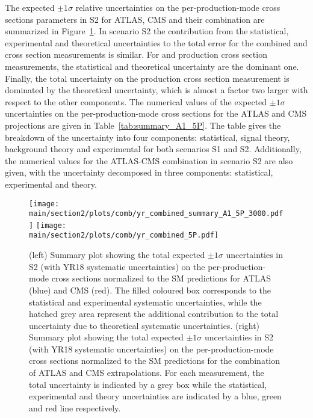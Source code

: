 The expected $\pm 1\sigma$ relative uncertainties on the per-production-mode cross sections parameters in S2 for ATLAS, CMS and their combination are summarized in Figure~\ref{fig:summary_A1_5P}.
In scenario S2 the contribution from the statistical, experimental and theoretical uncertainties to the total error for the combined  \ggH and \vbf cross section measurements is similar. For \wh and \zh production cross section measurements, the statistical  and theoretical uncertainty are the dominant one.
Finally, the total uncertainty on the \tth production cross section measurement is dominated by the theoretical uncertainty, which is almost a factor two larger with respect to the other components.
The numerical values of the expected $\pm 1\sigma$ uncertainties on the per-production-mode cross sections for the ATLAS and CMS projections are given in Table~\ref{tab:summary_A1_5P}. The table  gives the breakdown of the uncertainty into four components: statistical, signal theory, background theory and experimental for both scenarios S1 and S2. Additionally, the numerical values for the ATLAS-CMS combination in scenario S2 are also given, with the uncertainty decomposed in three components: statistical, experimental and theory.

\begin{figure}[hbtp]
\centering
\texttt{[image: \\main/section2/plots/comb/yr\_combined\_summary\_A1\_5P\_3000.pdf]}%
\texttt{[image: \\main/section2/plots/comb/yr\_combined\_5P.pdf]}%
\caption{(left) Summary plot showing the total expected $\pm 1\sigma$ uncertainties in S2 (with YR18 systematic uncertainties) on the  per-production-mode cross sections normalized to the SM predictions   for ATLAS (blue)  and CMS (red). The filled coloured box corresponds to the statistical and experimental systematic uncertainties, while the hatched grey area represent the additional contribution to the total uncertainty due to theoretical systematic uncertainties.
(right) Summary plot showing the total expected $\pm 1\sigma$  uncertainties in S2 (with YR18 systematic uncertainties) on the per-production-mode cross sections normalized to the SM predictions for the combination of ATLAS and CMS extrapolations. For each measurement,  the total uncertainty is indicated by a grey box while the statistical, experimental and theory uncertainties are indicated by a blue, green and red line respectively.}
\label{fig:summary_A1_5P}
\end{figure}


